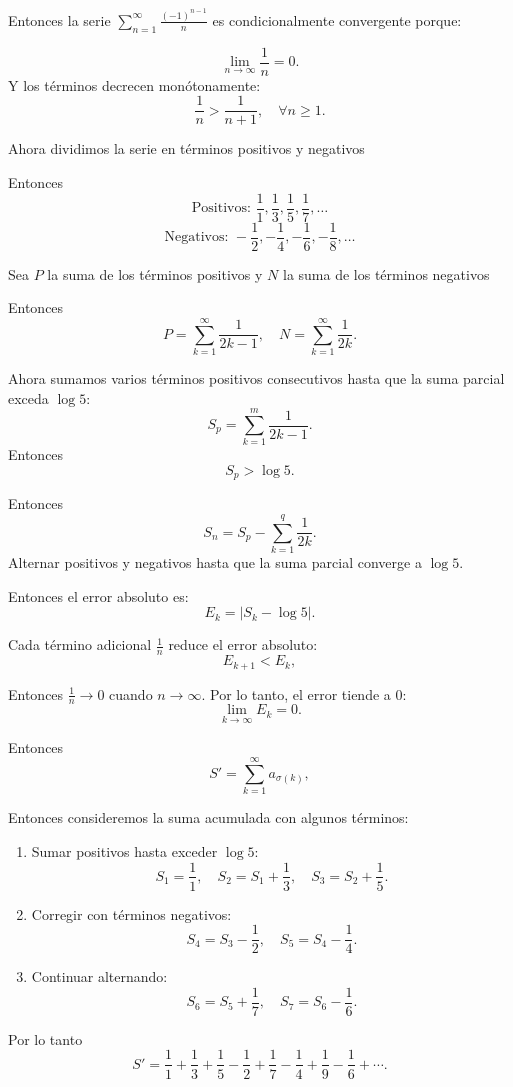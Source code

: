 \documentclass{article}
\begin{document}
\begin{enumerate}
Entonces la serie \(\sum_{n=1}^\infty \frac{(-1)^{n-1}}{n}\) es condicionalmente convergente porque:

    \[
    \lim_{n \to \infty} \frac{1}{n} = 0.
    \]
    Y los términos decrecen monótonamente:
    \[
    \frac{1}{n} > \frac{1}{n+1}, \quad \forall n \geq 1.
    \]

Ahora dividimos la serie en términos positivos y negativos


Entonces 
\[
\text{Positivos: } \frac{1}{1}, \frac{1}{3}, \frac{1}{5}, \frac{1}{7}, \dots
\]
\[
\text{Negativos: } -\frac{1}{2}, -\frac{1}{4}, -\frac{1}{6}, -\frac{1}{8}, \dots
\]

Sea \(P\) la suma de los términos positivos y \(N\) la suma de los términos negativos

Entonces 
\[
P = \sum_{k=1}^\infty \frac{1}{2k-1}, \quad N = \sum_{k=1}^\infty \frac{1}{2k}.
\]


Ahora sumamos varios términos positivos consecutivos hasta que la suma parcial exceda \(\log 5\):
\[
S_p = \sum_{k=1}^m \frac{1}{2k-1}.
\]
Entonces 
\[
S_p > \log 5.
\]

 Entonces
 \[
    S_n = S_p - \sum_{k=1}^q \frac{1}{2k}.
    \]
    Alternar  positivos y negativos hasta que la suma parcial converge a \(\log 5\).


Entonces el error absoluto es:
\[
E_k = \left| S_k - \log 5 \right|.
\]

Cada término adicional \(\frac{1}{n}\) reduce el error absoluto:
\[
E_{k+1} < E_k,
\]

Entonces  \(\frac{1}{n} \to 0\) cuando \(n \to \infty\). Por lo tanto, el error tiende a \(0\):
\[
\lim_{k \to \infty} E_k = 0.
\]

Entonces 
\[
S' = \sum_{k=1}^\infty a_{\sigma(k)},
\]

Entonces consideremos la suma acumulada con algunos términos:
\begin{enumerate}
    \item Sumar positivos hasta exceder \(\log 5\):
    \[
    S_1 = \frac{1}{1}, \quad S_2 = S_1 + \frac{1}{3}, \quad S_3 = S_2 + \frac{1}{5}.
    \]
    \item Corregir con términos negativos:
    \[
    S_4 = S_3 - \frac{1}{2}, \quad S_5 = S_4 - \frac{1}{4}.
    \]
    \item Continuar alternando:
    \[
    S_6 = S_5 + \frac{1}{7}, \quad S_7 = S_6 - \frac{1}{6}.
    \]
\end{enumerate}
Por lo tanto 
\[
S' = \frac{1}{1} + \frac{1}{3} + \frac{1}{5} - \frac{1}{2} + \frac{1}{7} - \frac{1}{4} + \frac{1}{9} - \frac{1}{6} + \cdots.
\]


\end{enumerate}
\end{document}
